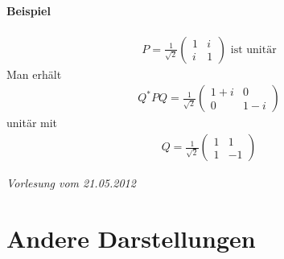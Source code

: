 \paragraph{Beispiel}
\begin{align}
P = \frac{1}{\sqrt{2}} \begin{pmatrix} 1 & i \\ i & 1\end{pmatrix} \text{ ist unitär}
\end{align}
Man erhält
\begin{align}
Q^{*} P Q = \frac{1}{\sqrt{2}} \begin{pmatrix} 1+i & 0 \\ 0 & 1-i\end{pmatrix} 
\end{align}
unitär mit
\begin{align}
Q = \frac{1}{\sqrt{2}} \begin{pmatrix} 1 & 1 \\ 1 & -1 \end{pmatrix}
\end{align}

\newpage
\noindent \textit{Vorlesung vom 21.05.2012} 
\section{Andere Darstellungen} %
